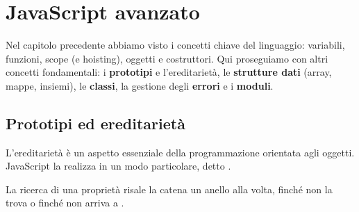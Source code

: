 \chapter{JavaScript avanzato}

Nel capitolo precedente abbiamo visto i concetti chiave del linguaggio:
variabili, funzioni, scope (e hoisting), oggetti e costruttori. Qui
proseguiamo con altri concetti fondamentali: i \textbf{prototipi} e
l'ereditarietà, le \textbf{strutture dati} (array, mappe, insiemi), le
\textbf{classi}, la gestione degli \textbf{errori} e i \textbf{moduli}.

\section{Prototipi ed ereditarietà}

L'ereditarietà è un aspetto essenziale della programmazione orientata agli
oggetti. JavaScript la realizza in un modo particolare, detto
.


La ricerca di una proprietà risale la catena un anello alla volta, finché non
la trova o finché non arriva a .

